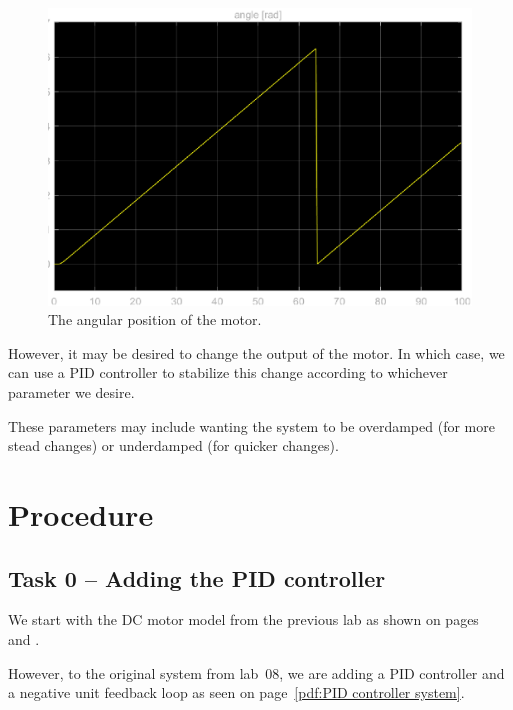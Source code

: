 \documentclass[12pt]{article}
\begin{document}
\begin{figure}
    \centering
    \includegraphics[width=\linewidth]{img/task05_angular_position.eps}
    \caption{The angular position of the motor.}
    \label{fig:angular position of motor}
\end{figure}

However, it may be desired to change the output of the motor. In which case, we can use a PID controller to stabilize this change according to whichever parameter we desire.

These parameters may include wanting the system to be overdamped (for more stead changes) or underdamped (for quicker changes).

\section{Procedure}\label{sec:procedure}

\subsection{Task 0 -- Adding the PID controller}\label{ssc:dc motor model}

We start with the DC motor model from the previous lab as shown on pages~\pageref{pdf:dc motor model} and \pageref{pdf:integrators}.

However, to the original system from lab~08, we are adding a PID controller and a negative unit feedback loop as seen on page~\ref{pdf:PID controller system}.
\end{document}
